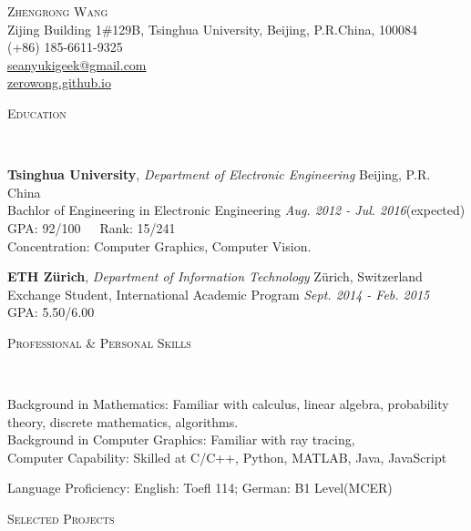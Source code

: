 \documentclass[a4paper]{article}
\newenvironment{changemargin}[2]{%
  \begin{list}{}{%
    \setlength{\topsep}{0pt}%
    \setlength{\leftmargin}{#1}%
    \setlength{\rightmargin}{#2}%
    \setlength{\listparindent}{\parindent}%
    \setlength{\itemindent}{\parindent}%
    \setlength{\parsep}{\parskip}%
  }%
  \item[]}{\end{list}
}
\newcommand{\lineover}{
	\begin{changemargin}{-0.05in}{-0.05in}
		\vspace*{-8pt}
		\hrulefill \\
		\vspace*{-2pt}
	\end{changemargin}
}
\newcommand{\header}[1]{
	\begin{changemargin}{-0.5in}{-0.5in}
		\scshape{#1}\\
  	\lineover
	\end{changemargin}
}
\newcommand{\contact}[5]{
	\begin{changemargin}{-0.5in}{-0.5in}
		\begin{center}
			{\Large \scshape {#1}}\\ \smallskip
			{#2}\\ \smallskip 
			{#3}\\ \smallskip
			{\href{mailto:#4}{#4}}\\ \smallskip
			{\href{#5}{#5}}\smallskip
		\end{center}
	\end{changemargin}
}
\newenvironment{body} {
	\vspace*{-16pt}
	\begin{changemargin}{-0.25in}{-0.5in}
  }	
	{\end{changemargin}
}
\begin{document}
\contact{Zhengrong Wang}{Zijing Building 1\#129B, Tsinghua University, Beijing, P.R.China, 100084}{(+86) 185-6611-9325}{seanyukigeek@gmail.com}{zerowong.github.io}


\header{Education}

\begin{body}
	\vspace{14pt}

	\textbf{Tsinghua University}, \emph{Department of Electronic Engineering} \hfill Beijing, P.R. China \\
Bachlor of Engineering in Electronic Engineering \hfill \emph{Aug. 2012 - Jul. 2016}(expected){} \\
GPA: 92/100\ \ \ Rank: 15/241\\
Concentration: Computer Graphics, Computer Vision. \\
\vspace{6pt}

	\textbf{ETH Z\"urich}, \emph{Department of Information Technology} \hfill Z\"urich, Switzerland \\
	Exchange Student, International Academic Program \hfill \emph{Sept. 2014 - Feb. 2015}{} \\
GPA: 5.50/6.00\\


\end{body}

\smallskip
\smallskip

\header{Professional \& Personal Skills}

\begin{body}
	\vspace{14pt}
	Background in Mathematics: Familiar with calculus, linear algebra, probability theory, discrete mathematics, algorithms.\\
	\smallskip
	Background in Computer Graphics: Familiar with ray tracing, \\
	\smallskip
	Computer Capability: Skilled at C/C++, Python, MATLAB, Java, JavaScript\\
	\smallskip

	Language Proficiency: English: Toefl 114; German: B1 Level(MCER)\\
\end{body}
\smallskip
\smallskip

\header{Selected Projects}
\end{document}
